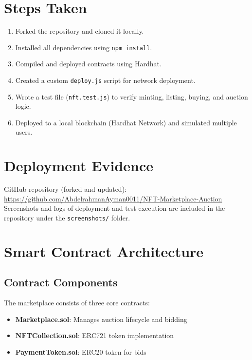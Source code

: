 \documentclass{article}
\begin{document}
\section*{Steps Taken}
\begin{enumerate}
  \item Forked the repository and cloned it locally.
  \item Installed all dependencies using \texttt{npm install}.
  \item Compiled and deployed contracts using Hardhat.
  \item Created a custom \texttt{deploy.js} script for network deployment.
  \item Wrote a test file (\texttt{nft.test.js}) to verify minting, listing, buying, and auction logic.
  \item Deployed to a local blockchain (Hardhat Network) and simulated multiple users.
\end{enumerate}

\section*{Deployment Evidence}
GitHub repository (forked and updated): \\
\url{https://github.com/AbdelrahmanAyman0011/NFT-Marketplace-Auction} \\
Screenshots and logs of deployment and test execution are included in the repository under the \texttt{screenshots/} folder.

\section{Smart Contract Architecture}

\subsection{Contract Components}
The marketplace consists of three core contracts:

\begin{itemize}
    \item \textbf{Marketplace.sol}: Manages auction lifecycle and bidding
    \item \textbf{NFTCollection.sol}: ERC721 token implementation
    \item \textbf{PaymentToken.sol}: ERC20 token for bids
\end{itemize}
\end{document}
